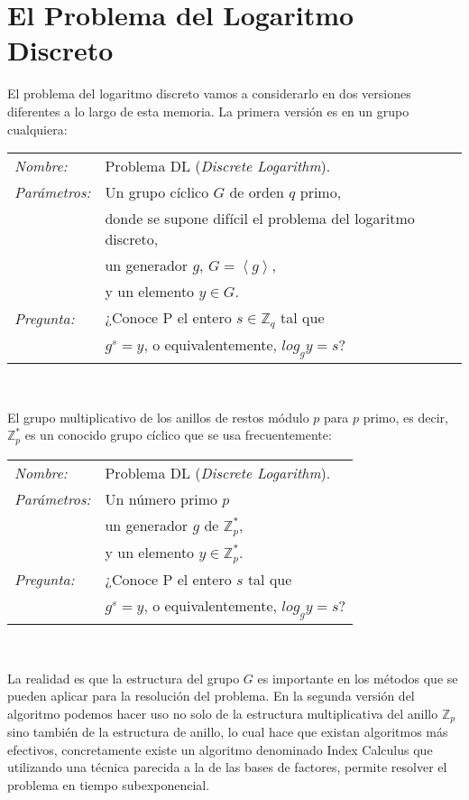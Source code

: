 \section{El Problema del Logaritmo Discreto}

El problema del logaritmo discreto vamos a considerarlo en dos versiones diferentes a lo largo de esta memoria. La primera versi\'on es en un grupo cualquiera:

\hfil

\begin{tabular}{|ll}\label{problemaDL}
	\textit{Nombre:} & Problema DL (\textit{Discrete Logarithm}). \\
	\textit{Parámetros:} & Un grupo cíclico $G$ de orden $q$ primo, \\ & donde se supone difícil el problema del logaritmo discreto,  \\ & un generador $g$, $G=\left\langle g \right\rangle$,\\ & y un elemento $y\in G$. \\
	\textit{Pregunta:} & ¿Conoce P el entero $s\in \mathbb{Z}_q$ tal que \\ & $g^s = y$, o equivalentemente, $log_g y = s$? \\
\end{tabular}
\\

\hfil

El grupo multiplicativo de los anillos de restos m\'odulo $p$ para $p$ primo, es decir, ${\mathbb Z}^*_p$ es un conocido grupo c\'iclico que se usa frecuentemente:

\hfil

\begin{tabular}{|ll}
	\textit{Nombre:} & Problema DL (\textit{Discrete Logarithm}). \\
	\textit{Parámetros:} & Un n\'umero primo $p$ \\ & un generador $g$ de ${\mathbb Z}_p^*$,\\ & y un elemento $y\in {\mathbb Z}_p^*$. \\
	\textit{Pregunta:} & ¿Conoce P el entero $s$ tal que \\ & $g^s = y$, o equivalentemente, $log_g y = s$? \\
\end{tabular}
\\

\hfil

La realidad es que la estructura del grupo $G$ es importante en los m\'etodos que se pueden aplicar para la resoluci\'on del problema. En la segunda versi\'on del algoritmo
podemos hacer uso no solo de la estructura multiplicativa del anillo ${\mathbb Z}_p$ sino tambi\'en de la estructura de anillo, lo cual hace que existan algoritmos m\'as efectivos,
concretamente existe un algoritmo denominado Index Calculus que utilizando una t\'ecnica parecida a la de las bases de factores, permite resolver el problema en tiempo subexponencial.

